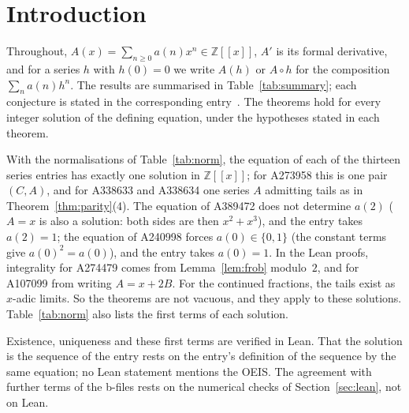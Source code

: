\documentclass[11pt]{article}
\theoremstyle{remark}
\newcommand{\Z}{\mathbb Z}
\begin{document}
\section{Introduction}\label{sec:intro}
Throughout, $A(x)=\sum_{n\ge0}a(n)x^n\in\Z[[x]]$, $A'$ is its formal
derivative, and for a series $h$ with $h(0)=0$ we write $A(h)$ or $A\circ h$
for the composition $\sum_n a(n)h^n$. The results are summarised in
Table~\ref{tab:summary}; each conjecture is stated in the corresponding
entry~\cite{oeis}. The theorems hold for every integer solution of the
defining equation, under the hypotheses stated in each theorem.

With the normalisations of Table~\ref{tab:norm}, the equation of each of the
thirteen series entries has exactly one solution in $\Z[[x]]$; for A273958 this
is one pair $(C,A)$, and for A338633 and A338634 one series $A$ admitting tails
as in Theorem~\ref{thm:parity}(4). The equation of A389472 does not determine
$a(2)$ ($A=x$ is also a solution: both sides are then $x^2+x^3$), and the entry takes $a(2)=1$; the equation
of A240998 forces $a(0)\in\{0,1\}$ (the constant terms give $a(0)^2=a(0)$), and the entry takes $a(0)=1$. In the Lean
proofs, integrality for A274479 comes from Lemma~\ref{lem:frob} modulo~$2$, and
for A107099 from writing $A=x+2B$. For the continued fractions, the tails exist as $x$-adic limits. So the theorems are not vacuous, and they apply
to these solutions. Table~\ref{tab:norm} also lists the first terms of each
solution.

Existence, uniqueness and these first terms are verified in Lean. That the
solution is the sequence of the entry rests on the entry's definition of the
sequence by the same equation; no Lean statement mentions the OEIS. The agreement
with further terms of the b-files rests on the numerical checks of
Section~\ref{sec:lean}, not on Lean.
\end{document}
